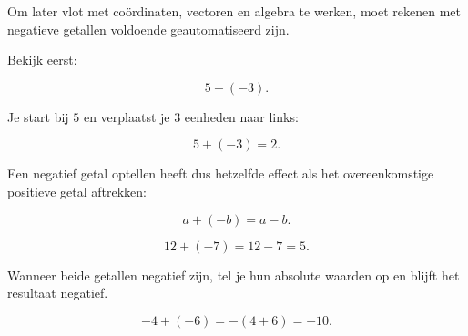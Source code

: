 \documentclass{ximera}
\begin{document}
Om later vlot met coördinaten, vectoren en algebra te werken, moet rekenen
met negatieve getallen voldoende geautomatiseerd zijn.




Bekijk eerst:

\[
5+(-3).
\]

Je start bij \(5\) en verplaatst je \(3\) eenheden naar links:

\[
5+(-3)=2.
\]

Een negatief getal optellen heeft dus hetzelfde effect als het
overeenkomstige positieve getal aftrekken:

\[
a+(-b)=a-b.
\]


\begin{voorbeeld}

\[
12+(-7)=12-7=5.
\]

\end{voorbeeld}


Wanneer beide getallen negatief zijn, tel je hun absolute waarden op en blijft
het resultaat negatief.

\begin{voorbeeld}

\[
-4+(-6)
=
-(4+6)
=
-10.
\]

\end{voorbeeld}
\end{document}
